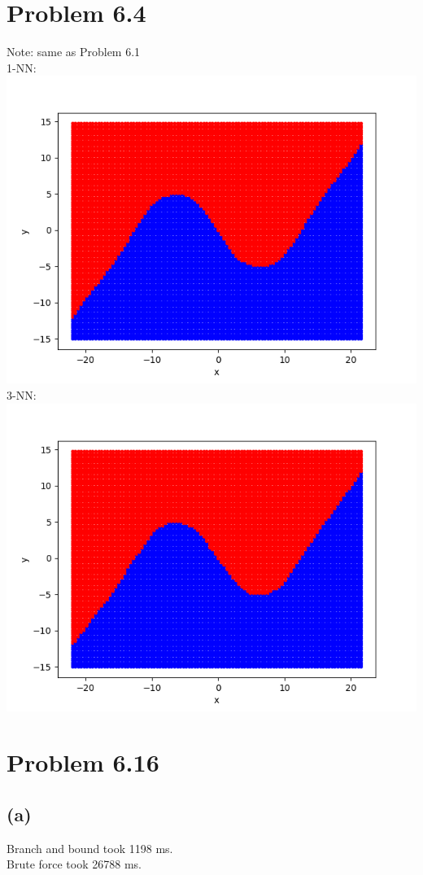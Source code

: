 \documentclass{article}
\begin{document}
	\section*{Problem 6.4}
		Note: same as Problem 6.1\\
		1-NN:\\
		\includegraphics[scale=0.8]{p6.4a}\\
		3-NN:\\
		\includegraphics[scale=0.8]{p6.4b}
		
	\section*{Problem 6.16}
	\subsection*{(a)}
		Branch and bound took 1198 ms.\\
		Brute force took 26788 ms.
\end{document}
